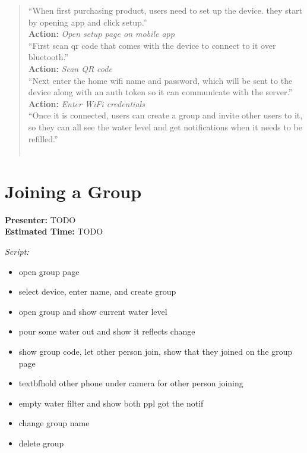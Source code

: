 \documentclass[12pt]{article}
\begin{document}
\begin{quote}

``When first purchasing product, users need to set up the device. they start by opening app and click setup.''
\vspace{5px}\\\textbf{Action: }\textit{Open setup page on mobile app}\vspace{5px}\\
``First scan qr code that comes with the device to connect to it over bluetooth.''
\vspace{5px}\\\textbf{Action: }\textit{Scan QR code}\vspace{5px}\\
``Next enter the home wifi name and password, which will be sent to the device along with an auth token so it can communicate with the server.''
\vspace{5px}\\\textbf{Action: }\textit{Enter WiFi credentials}\vspace{5px}\\
``Once it is connected, users can create a group and invite other users to it, so they can all see the water level and get notifications when it needs to be refilled.''
\\\textit{}\\
\end{quote}

\section{Joining a Group}
\noindent\textbf{Presenter:} TODO\\  
\noindent\textbf{Estimated Time:} TODO

\bigskip
\noindent\textit{Script:}

\begin{itemize}[itemsep=-3pt]
\item open group page
\item select device, enter name,  and create group
\item open group and show current water level
\item pour some water out and show it reflects change
\item show group code, let other person join, show that they joined on the group page
\item textbf{hold other phone under camera for other person joining}
\item empty water filter and show both ppl got the notif
\item change group name
\item delete group
\end{itemize}
\end{document}
